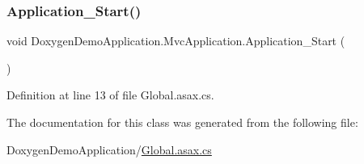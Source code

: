 \subsubsection{\texorpdfstring{Application\+\_\+\+Start()}{Application\_Start()}}
{\footnotesize\ttfamily void Doxygen\+Demo\+Application.\+Mvc\+Application.\+Application\+\_\+\+Start (\begin{DoxyParamCaption}{ }\end{DoxyParamCaption})\hspace{0.3cm}{\ttfamily [protected]}}



Definition at line 13 of file Global.\+asax.\+cs.



The documentation for this class was generated from the following file\+:\begin{DoxyCompactItemize}
\item 
Doxygen\+Demo\+Application/\mbox{\hyperlink{_global_8asax_8cs}{Global.\+asax.\+cs}}\end{DoxyCompactItemize}
